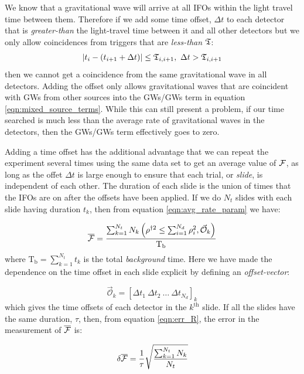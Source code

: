 We know that a gravitational wave will arrive at all \ac{IFO}s within the light travel time between them. Therefore if we add some time offset, $\Delta t$ to each detector that is \emph{greater-than} the light-travel time between it and all other detectors but we only allow coincidences from triggers that are \emph{less-than} $\mathfrak{T}$:
\begin{equation}
\label{eqn:time_constraint}
|t_i - (t_{i+1}+\Delta t)| \le \mathfrak{T}_{i,i+1},~\Delta t > \mathfrak{T}_{i,i+1}
\end{equation}
then we cannot get a coincidence from the same gravitational wave in all detectors. Adding the offset only allows gravitational waves that are coincident with \acp{GW} from other sources into the GWs/GWs term in equation \ref{eqn:mixed_source_terms}. While this can still present a problem, if our time searched is much less than the average rate of gravitational waves in the detectors, then the GWs/GWs term effectively goes to zero.

Adding a time offset has the additional advantage that we can repeat the experiment several times using the same data set to get an average value of $\mathcal{F}$, as long as the offet $\Delta t$ is large enough to ensure that each trial, or \emph{slide}, is independent of each other. The duration of each slide is the union of times that the \acp{IFO} are on after the offsets have been applied. If we do $N_{t}$ slides with each slide having duration $t_{k}$, then from equation \ref{eqn:avg_rate_param} we have:

\begin{equation}
\overline{\mathcal{F}} = \frac{\sum_{k=1}^{N_t} N_k\left(\rho^{\dagger2} \leq \sum_{i=1}^{N_d} \rho_i^2, \vec{\mathcal{O}}_k\right)}{\mathrm{T_{b}}}
\end{equation}
where $\mathrm{T_{b}} = \sum_{k=1}^{N_t}t_k$ is the total \emph{background} time. Here we have made the dependence on the time offset in each slide explicit by defining an \emph{offset-vector}:

\begin{equation}
\vec{\mathcal{O}}_k = \left[\Delta t_1 ~ \Delta t_2 ~ \ldots ~ \Delta t_{N_d} \right]_k %
\end{equation}
which gives the time offsets of each detector in the $k^{\mathrm{th}}$ slide. If all the slides have the same duration, $\tau$, then, from equation \ref{eqn:err_R}, the error in the measurement of $\overline{\mathcal{F}}$ is:

\begin{equation}
\delta \overline{\mathcal{F}} = \frac{1}{\tau}\sqrt{\frac{\sum_{k=1}^{N_t} N_k}{N_t}}
\end{equation}

